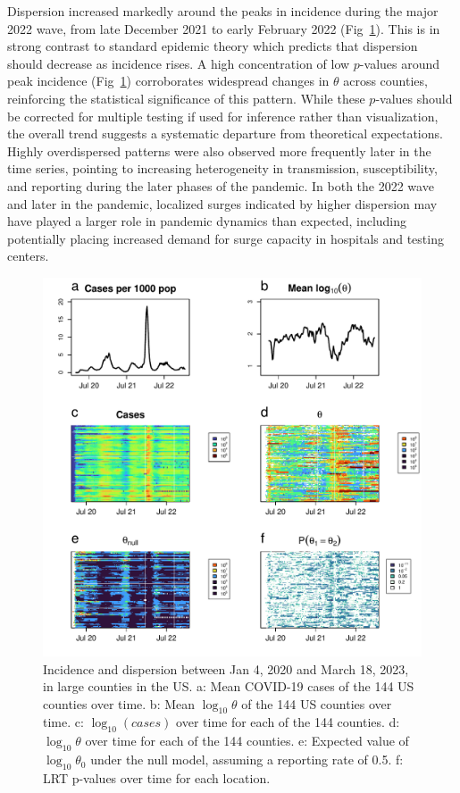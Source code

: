 \documentclass[11pt,letterpaper]{article}
\begin{document}
Dispersion increased markedly around the peaks in incidence during the major 2022 wave, from late December 2021 to early February 2022 (Fig~\ref{fig3}).
This is in strong contrast to standard epidemic theory which predicts that dispersion should decrease as incidence rises.
A high concentration of low $p$-values around peak incidence (Fig~\ref{fig3}) corroborates widespread changes in $\theta$ across counties, reinforcing the statistical significance of this pattern.
While these $p$-values should be corrected for multiple testing if used for inference rather than visualization, the overall trend suggests a systematic departure from theoretical expectations.
Highly overdispersed patterns were also observed more frequently later in the time series, pointing to increasing heterogeneity in transmission, susceptibility, and reporting during the later phases of the pandemic. 
In both the 2022 wave and later in the pandemic, localized surges indicated by higher dispersion may have played a larger role in pandemic dynamics than expected, including potentially placing increased demand for surge capacity in hospitals and testing centers.

\clearpage
\begin{figure}[!ht]
\includegraphics[width=1\textwidth]{fig3}
\caption{Incidence and dispersion between Jan 4, 2020 and March 18, 2023, in large counties in the US.
a: Mean COVID-19 cases of the 144 US counties over time. 
b: Mean $\log_{10}\theta$ of the 144 US counties over time.  
c: $\log_{10}(cases)$ over time for each of the 144 counties.
d: $\log_{10}\theta$ over time for each of the 144 counties.
e: Expected value of $\log_{10}\theta_0$ under the null model, assuming a reporting rate of 0.5.
f: LRT p-values over time for each location.}\label{fig3}
\end{figure}
\clearpage
\end{document}
